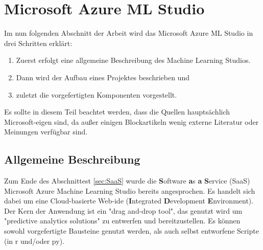 \chapter{Microsoft Azure ML Studio}\label{sec:msmls}
Im nun folgenden Abschnitt der Arbeit wird das Microsoft Azure ML Studio in drei Schritten erklärt:
\begin{enumerate}
\item Zuerst erfolgt eine allgemeine Beschreibung des Machine Learning Studios.
\item Dann wird der Aufbau eines Projektes beschrieben und
\item zuletzt die vorgefertigten Komponenten vorgestellt.
\end{enumerate}
Es sollte in diesem Teil beachtet werden, dass die Quellen hauptsächlich Microsoft-eigen sind, da außer einigen Blockartikeln wenig externe Literatur oder Meinungen verfügbar sind.
\section{Allgemeine Beschreibung}\label{sec:ab1}
Zum Ende des Abschnittest \ref{sec:SaaS} wurde die \textbf{S}oftware \textbf{a}s \textbf{a} \textbf{S}ervice (SaaS) Microsoft Azure Machine Learning Studio bereits angesprochen. Es handelt sich dabei um eine Cloud-basierte Web-\gls{ide} (\textbf{I}ntegrated \textbf{D}evelopment \textbf{E}nvironment). Der Kern der Anwendung ist ein "drag and-drop tool", das genutzt wird um "predictive analytics solutions" zu entwerfen und bereitzustellen.\citep{ericson_what_2017} Es können sowohl vorgefertigte Bausteine genutzt werden, als auch selbst entworfene Scripte (in \gls{r} und/oder \gls{py}).
